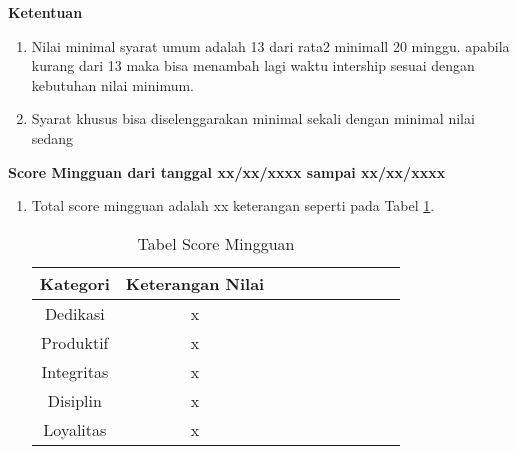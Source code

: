 \textbf {Ketentuan}
\begin{enumerate}
  \item Nilai minimal syarat umum adalah 13 dari rata2 minimall 20 minggu. apabila kurang dari 13 maka bisa menambah lagi waktu intership sesuai dengan kebutuhan nilai minimum.
  \item Syarat khusus bisa diselenggarakan minimal sekali dengan minimal nilai sedang
\end{enumerate}

\textbf{Score Mingguan dari tanggal xx/xx/xxxx sampai xx/xx/xxxx}
\begin{enumerate}
\item Total score mingguan adalah xx keterangan seperti pada Tabel \ref{table:scoremingguan}.
\begin{table}[!ht]
\centering
\begin{tabular}{ |c|c|c|c|c|c|c|c|c|c| }
\hline
Kategori & Keterangan Nilai \\
\hline
Dedikasi & x \\
\hline
Produktif & x \\
\hline
Integritas & x \\
\hline
Disiplin & x \\
\hline
Loyalitas & x \\
\hline
\end{tabular}
\caption{Tabel Score Mingguan}
\label{table:scoremingguan}
\end{table}
\end{enumerate}

